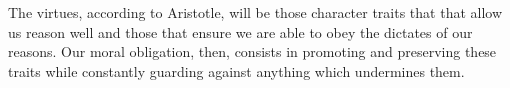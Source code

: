 \documentclass[9pt]{article}
\begin{document}
The virtues, according to Aristotle, will be those character traits that
that allow us reason well and those that ensure we are able to obey the
dictates of our reasons. Our moral obligation, then, consists in
promoting and preserving these traits while constantly guarding against
anything which undermines them.
\end{document}
